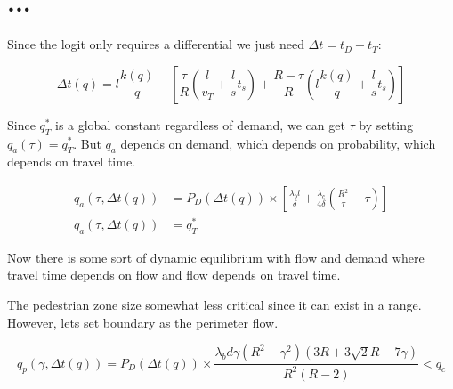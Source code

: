 \documentclass{article}
\begin{document}
\section{...}

Since the logit only requires a differential we just need $\Delta t = t_D - t_T$:

\begin{equation}
    \Delta t(q) = l \frac{k(q)}{q} - \left[
    \frac{\tau}{R} \left( \frac{l}{v_T} + \frac{l}{s}t_s \right) + \frac{R-\tau}{R} \left( l\frac{k(q)}{q} + \frac{l}{s}t_s \right) \right]
\end{equation}

\noindent Since $q^*_T$ is a global constant regardless of demand, we can get $\tau$ by setting $q_a(\tau)=q^*_T$. But $q_a$ depends on demand, which depends on probability, which depends on travel time.

\begin{align}
    q_a(\tau, \Delta t(q)) & = P_D(\Delta t(q)) \times \left[ \frac{\lambda_b l}{\delta} + \frac{\lambda_c}{4\delta} \left( \frac{R^2}{\tau} - \tau \right) \right] \\
    q_a(\tau, \Delta t(q)) & = q^*_T
\end{align}

\noindent Now there is some sort of dynamic equilibrium with flow and demand where travel time depends on flow and flow depends on travel time. 

The pedestrian zone size somewhat less critical since it can exist in a range. However, lets set boundary as the perimeter flow.

\begin{equation}
        q_p(\gamma, \Delta t(q)) = P_D(\Delta t(q)) \times \frac{\lambda_b d \gamma (R^2 - \gamma^2) (3R + 3\sqrt{2}R - 7\gamma)}{R^2(R-2)} < q_c
\end{equation}
\end{document}
